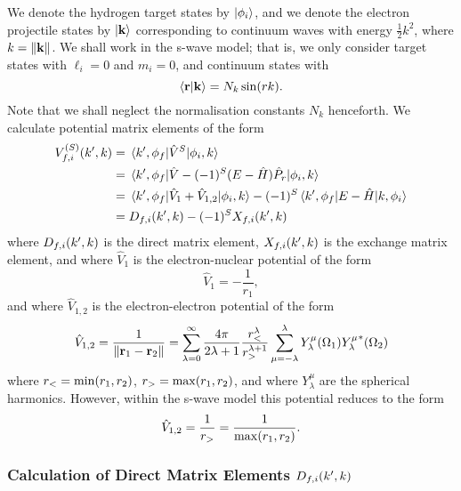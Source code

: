 \documentclass{article}
\begin{document}
We denote the hydrogen target states by $\ket{\phi_{i}}$, and we denote the
electron projectile states by $\ket{\vb{k}}$ corresponding to continuum waves
with energy $\tfrac{1}{2} k^{2}$, where $k = \lVert\vb{k}\rVert$.
We shall work in the s-wave model; that is, we only consider target states
with $\ell_{i} = 0$ and $m_{i} = 0$, and continuum states with
\begin{equation*}
  \braket{\vb{r}}{\vb{k}}
  =
  N_{k}
  \sin(r k)
  .
\end{equation*}
Note that we shall neglect the normalisation constants $N_{k}$ henceforth.
We calculate potential matrix elements of the form
\begin{alignat*}{2}
  V_{f, i}^{(S)}(k', k)
  {}={}
  &
  \mel{k', \phi_{f}}{\hat{V}^{S}}{\phi_{i}, k}
  \\
  {}={}
  &
  \mel
  {k', \phi_{f}}
  {\hat{V} - (-1)^{S}(E- \hat{H})\hat{P}_{r}}
  {\phi_{i}, k}
  \\
  {}={}
  &
  \mel{k', \phi_{f}}{\hat{V}_{1} + \hat{V}_{1, 2}}{\phi_{i}, k}
  -
  (-1)^{S}
  \mel{k', \phi_{f}}{E - \hat{H}}{k, \phi_{i}}
  \\
  {}={}
  &
  D_{f, i}(k', k)
  -
  (-1)^{S}
  X_{f, i}(k', k)
\end{alignat*}
where $D_{f, i}(k', k)$ is the direct matrix element, $X_{f, i}(k', k)$ is
the exchange matrix element, and where $\hat{V}_{1}$ is the electron-nuclear
potential of the form
\begin{equation*}
  \hat{V}_{1}
  =
  -
  \dfrac{1}{r_{1}}
  ,
\end{equation*}
and where $\hat{V}_{1, 2}$ is the electron-electron potential of the form
\begin{equation*}
  \hat{V}_{1, 2}
  =
  \dfrac{1}{\lVert\vb{r}_{1} - \vb{r}_{2}\rVert}
  =
  \sum_{\lambda = 0}^{\infty}
  \dfrac{4\pi}{2\lambda + 1}
  \dfrac{r_{<}^{\lambda}}{r_{>}^{\lambda + 1}}
  \sum_{\mu = -\lambda}^{\lambda}
  Y_{\lambda}^{\mu}(\Omega_{1})
  {Y_{\lambda}^{\mu}}^{*}(\Omega_{2})
\end{equation*}
where $r_{<} = \min(r_{1}, r_{2})$, $r_{>} = \max(r_{1}, r_{2})$,
and where $Y_{\lambda}^{\mu}$ are the spherical harmonics.
However, within the s-wave model this potential reduces to the form
\begin{equation*}
  \hat{V}_{1, 2}
  =
  \dfrac{1}{r_{>}}
  =
  \dfrac{1}{\max(r_{1}, r_{2})}
  .
\end{equation*}

\subsubsection{Calculation of Direct Matrix Elements $D_{f, i}(k', k)$}
\label{sec:calc-dir-me}
\end{document}

